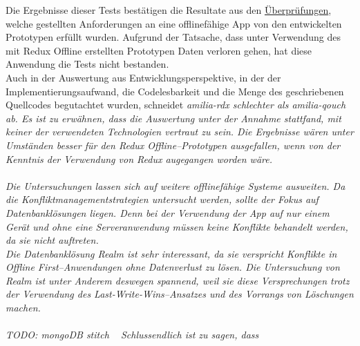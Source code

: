 Die Ergebnisse dieser Tests bestätigen die Resultate aus den \hyperref[chap:auswertunganforderungen]{Überprüfungen}, welche gestellten Anforderungen an eine offlinefähige \gls{App} von den entwickelten Prototypen erfüllt wurden.
Aufgrund der Tatsache, dass unter Verwendung des mit Redux Offline erstellten Prototypen Daten verloren gehen, hat diese Anwendung die Tests nicht bestanden.\\
Auch in der Auswertung aus Entwicklungsperspektive, in der der Implementierungsaufwand, die Codelesbarkeit und die Menge des geschriebenen Quellcodes begutachtet wurden, schneidet \it{amilia-rdx} schlechter als \it{amilia-qouch} ab.
Es ist zu erwähnen, dass die Auswertung unter der Annahme stattfand, mit keiner der verwendeten Technologien vertraut zu sein.
Die Ergebnisse wären unter Umständen besser für den Redux Offline--Prototypen ausgefallen, wenn von der Kenntnis der Verwendung von Redux augegangen worden wäre.\\\\
%
%
Die Untersuchungen lassen sich auf weitere offlinefähige Systeme ausweiten.
Da die Konfliktmanagementstrategien untersucht werden, sollte der Fokus auf Datenbanklösungen liegen.
Denn bei der Verwendung der \gls{App} auf nur einem Gerät und ohne eine Serveranwendung müssen keine Konflikte behandelt werden, da sie nicht auftreten.\\
Die Datenbanklösung Realm ist sehr interessant, da sie verspricht Konflikte in Offline First--Anwendungen ohne Datenverlust zu lösen.
Die Untersuchung von Realm ist unter Anderem deswegen spannend, weil sie diese Versprechungen trotz der Verwendung des Last-Write-Wins--Ansatzes und des Vorrangs von Löschungen machen.\\\\
TODO: mongoDB stitch ~\cite{stitch}
%
%
Schlussendlich ist zu sagen, dass 